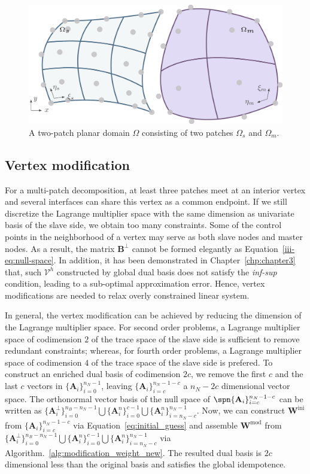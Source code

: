 \begin{figure}[ht]
	\center
	\includegraphics[width=.7\columnwidth]{two_patch_domain}
	\caption{A two-patch planar domain $\Omega$ consisting of two patches $\Omega_s$ and $\Omega_m$. }\label{fig:two_patch_domain}
\end{figure}

\subsection{Vertex modification}

For a multi-patch decomposition, at least three patches meet at an interior vertex and several interfaces can share this vertex as a common endpoint. If we still discretize the Lagrange multiplier space with the same dimension as univariate basis of the slave side, we obtain too many constraints. Some of the control points in the neighborhood of a vertex may serve as both slave nodes and master nodes. As a result, the matrix $\mathbf{B}^\perp$ cannot be formed elegantly as Equation~\eqref{iii-eq:null-space}. In addition, it has been demonstrated in Chapter~\ref{chp:chapter3} that, such $\mathcal{V}^h$ constructed by global dual basis does not satisfy the \textit{inf-sup} condition, leading to a sub-optimal approximation error. Hence, vertex modifications are needed to relax overly constrained linear system.\par

In general, the vertex modification can be achieved by reducing the dimension of the Lagrange multiplier space. For second order problems, a Lagrange multiplier space of codimension $2$ of the trace space of the slave side is sufficient to remove redundant constraints; whereas, for fourth order problems, a Lagrange multiplier space of codimension $4$
of the trace space of the slave side is prefered. To construct an enriched dual basis of codimension $2c$, we remove the first $c$ and the last $c$ vectors in $\{\mathbf{A}_i\}_{i=0}^{n_N-1}$, leaving $\{\mathbf{A}_i\}_{i=c}^{n_N-1-c}$ a $n_N-2c$ dimensional vector space. The orthonormal vector basis of the null space of $\spn\{\mathbf{A}_i\}_{i=c}^{n_N-1-c}$ can be written as $\{\mathbf{A}^\perp_i\}_{i=0}^{n_B-n_N-1}\bigcup\{\mathbf{A}^n_i\}_{i=0}^{c-1}\bigcup\{\mathbf{A}^n_i\}_{i=n_N-c}^{n_N-1}$. Now, we can construct $\mathbf{W}^\text{ini}$ from $\{\mathbf{A}_i\}_{i=c}^{n_N-1-c}$ via Equation~\eqref{eq:initial_guess} and assemble $\mathbf{W}^\text{mod}$ from $\{\mathbf{A}^\perp_i\}_{i=0}^{n_B-n_N-1}\bigcup\{\mathbf{A}^n_i\}_{i=0}^{c-1}\bigcup\{\mathbf{A}^n_i\}_{i=n_N-c}^{n_N-1}$ via Algorithm.~\ref{alg:modification_weight_new}. The resulted dual basis is $2c$ dimensional less than the original basis and satisfies the global idempotence.

